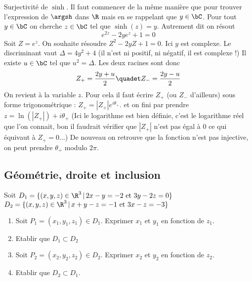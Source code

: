 \begin{correction}
\begin{enumerate}
\end{enumerate}


Surjectivité de $\sinh$. Il faut commencer de la même manière que pour trouver l'expression de $\argsh$ dans $\R$ mais en se rappelant que $y\in \bC$. Pour tout $y\in \bC$ on cherche $z\in \bC$ tel que $\sinh(z) =y$. Autrement dit on résout 
$$e^{2z}-2ye^{z} +1=0$$
Soit $Z=e^{z}$. On souhaite résoudre $Z^2 -2yZ+1=0$. 
Ici $y$ est complexe.  Le discriminant vaut $\Delta=4y^2+4$ (il n'est ni positif, ni négatif, il est complexe !) Il existe $u \in \bC$ tel que $u^2 =\Delta$. 
Les deux racines sont donc 
$$Z_+ = \frac{2y +u}{2} \quadet Z_- = \frac{2y-u}{2}$$
On revient à la variable $z$.  Pour cela il faut écrire 
$Z_+ $ (ou $Z_-$ d'ailleurs) sous forme trigonométrique : 
$Z_+ = |Z_+|e^{i\theta_+}$. 
et on fini par prendre $z = \ln(|Z_+|) +i\theta_+$
(Ici le logarithme est bien définie, c'est le logarithme réel que l'on connait, bon il faudrait vérifier que $|Z_+|$ n'est pas égal à 0 ce qui équivaut à $Z_+ =0$...) 
De nouveau on retrouve que la fonction n'est pas injective, on peut prendre $\theta_+ $ modulo $2\pi$. 
\end{correction}









\subsection{Géométrie, droite et inclusion}

\begin{exercice}
Soit $D_1 = \{ (x,y,z) \in \R^3 \, |\, 2x-y=-2 \text{ et } 3y -2z=0\}$
$D_2 = \{ (x,y,z) \in \R^3 \, |\, x+y-z=-1 \text{ et } 3x -z=-3\}$

\begin{enumerate}
\item Soit $P_1=(x_1,y_1,z_1)\in D_1$. Exprimer $x_1$ et $y_1$ en fonction de $z_1$. 
\item Etablir que $D_1\subset D_2$
\item Soit $P_2=(x_2,y_2,z_2)\in D_2$. Exprimer $x_2$ et $y_2$ en fonction de $z_2$. 
\item Etablir que $D_2\subset D_1$. 
\end{enumerate}

\end{exercice}

